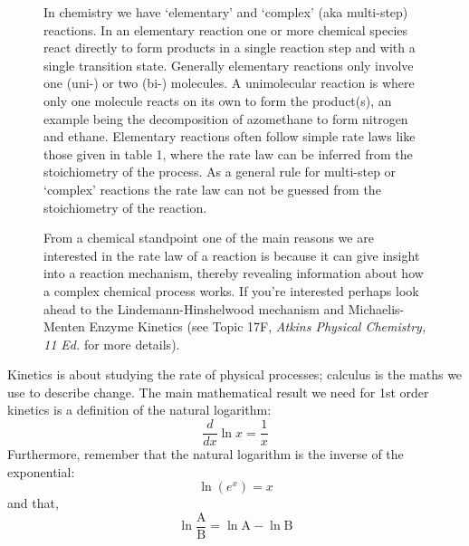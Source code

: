 \documentclass[	DIV=calc,%
							paper=a4,%
							fontsize=11pt,%
							twocolumn]{scrartcl}	 					%
\begin{document}
\begin{figure}[h]
    \begin{tcolorbox}[colback=blue!5,colframe=AirForceBlue!100!black,title=Elementary reactions]
        In chemistry we have `elementary' and `complex' (aka multi-step) reactions. In an elementary reaction one or more chemical species react directly to form products in a single reaction step and with a single transition state. Generally elementary reactions only involve one (uni-) or two (bi-) molecules. A unimolecular reaction is where only one molecule reacts on its own to form the product(s), an example being the decomposition of azomethane to form nitrogen and ethane. Elementary reactions often follow simple rate laws like those given in table 1, where the rate law can be inferred from the stoichiometry of the process. As a general rule for multi-step or `complex' reactions the rate law can not be guessed from the stoichiometry of the reaction. 
    \end{tcolorbox}
\end{figure}


\begin{figure}[h]
    \begin{tcolorbox}[colback=red!5,colframe=red!40!black, title=Looking Forward: Multi-Step Reactions]
        From a chemical standpoint one of the main reasons we are interested in the rate law of a reaction is because it can give insight into a reaction mechanism, thereby revealing information about how a complex chemical process works. If you're interested perhaps look ahead to the Lindemann-Hinshelwood mechanism and Michaelis-Menten Enzyme Kinetics (see Topic 17F, \emph{Atkins Physical Chemistry, 11 Ed.} for more details).
    \end{tcolorbox}
\end{figure}

\begin{tcolorbox}[colback=blue!5,colframe=AirForceBlue!100!black,title=Calculus]
    Kinetics is about studying the rate of physical processes; calculus is the maths we use to describe change. The main mathematical result we need for 1st order kinetics is a definition of the natural logarithm:
    \begin{equation}
        \nonumber
        \frac{d}{dx} \ln{x} = \frac{1}{x}
    \end{equation}
    Furthermore, remember that the natural logarithm is the inverse of the exponential:
    \begin{equation}
        \nonumber
        \ln{(e^x)} = x
    \end{equation}
    and that,
    \begin{equation*}
         \ln\frac{\mathrm{A}}{\mathrm{B}} = \ln{\mathrm{A}} - \ln{\mathrm{B}}
    \end{equation*}
\end{tcolorbox}
\end{document}
